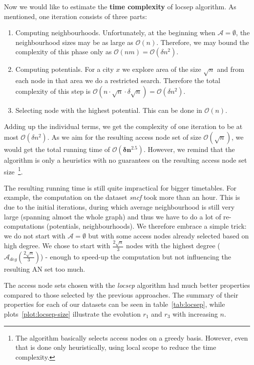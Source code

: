 		\noindent Now we would like to estimate the \textbf{time complexity} of locsep algorithm. As mentioned, one iteration consists of three parts:
		\begin{enumerate}
			\item Computing neighbourhoods. Unfortunately, at the beginning when $\mathcal{A} = \emptyset$, the neighbourhood sizes may be as large as $\mathcal{O}(n)$. Therefore, we may bound the complexity of this phase only as $\mathcal{O}(nm) = \mathcal{O}(\delta n^{2})$.
			\item Computing potentials. For a city $x$ we explore area of the size $\sqrt{n}$ and from each node in that area we do a restricted search. Therefore the total complexity of this step is $\mathcal{O}(n \cdot \sqrt{n} \cdot \delta \sqrt{n}) = \mathcal{O}(\delta n^{2})$.
			\item Selecting node with the highest potential. This can be done in $\mathcal{O}(n)$.
		\end{enumerate}
		\hspace*{\fill}
		
		\noindent Adding up the individual terms, we get the complexity of one iteration to be at most $\mathcal{O}(\delta n^{2})$. As we aim for the resulting access node set of size $\mathcal{O}(\sqrt{n})$, we would get the total running time of $\bm{\mathcal{O}(\delta n^{2.5})}$. However, we remind that the algorithm is only a heuristics with no guarantees on the resulting access node set size~\footnote{The algorithm basically selects access nodes on a greedy basis. However, even that is done only heuristically, using local scope to reduce the time complexity.}.
		
		The resulting running time is still quite impractical for bigger timetables. For example, the computation on the dataset \textit{sncf} took more than an hour. This is due to the initial iterations, during which average neighbourhood is still very large (spanning almost the whole graph) and thus we have to do a lot of re-computations (potentials, neighbourhoods). We therefore embrace a simple trick: we do not start with $\mathcal{A} = \emptyset$ but with some access nodes already selected based on high degree. We chose to start with $\frac{2 \sqrt{n}}{3}$ nodes with the highest degree ($\mathcal{A}_{deg}(\frac{2 \sqrt{n}}{3})$) - enough to speed-up the computation but not influencing the resulting AN set too much. 
		
		The access node sets chosen with the \textit{locsep} algorithm had much better properties compared to those selected by the previous approaches. The summary of their properties for each of our datasets can be seen in table~\ref{tab:locsep}, while plots~\ref{plot:locsep-size} illustrate the evolution $r_{1}$ and $r_{3}$ with increasing $n$. \\
		
